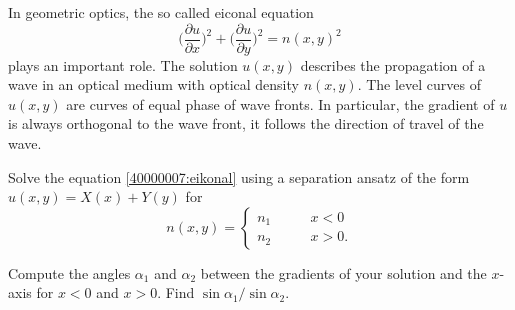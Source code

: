 In geometric optics, the so called eiconal equation
\begin{equation}
\biggl( \frac{\partial u}{\partial x}\biggr)^2
+
\biggl( \frac{\partial u}{\partial y}\biggr)^2
=
n(x,y)^2
\label{40000007:eikonal}
\end{equation}
plays an important role.
The solution $u(x,y)$ describes the propagation of a wave in an optical
medium with optical density $n(x,y)$.
The level curves of $u(x,y)$ are curves of equal phase of wave fronts.
In particular, the gradient of $u$ is always orthogonal to the wave front,
it follows the direction of travel of the wave.
\begin{teilaufgaben}
\item
Solve the equation
\eqref{40000007:eikonal}
using a separation ansatz of the form $u(x,y)=X(x) + Y(y)$ for 
\[
n(x,y)=
\begin{cases}n_1&\qquad x< 0\\
n_2&\qquad x>0.
\end{cases}
\]
\item
Compute the angles
$\alpha_1$ and $\alpha_2$
between the gradients of your solution and the $x$-axis for $x<0$ and
$x>0$.
Find 
$\sin\alpha_1/\sin\alpha_2$.
\end{teilaufgaben}

